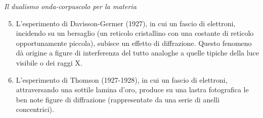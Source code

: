 \noindent \emph{Il dualismo onda-corpuscolo per la materia}
\begin{enumerate}
    \setcounter{enumi}{4}
    \item L'esperimento di Davisson-Germer (1927), in cui un fascio di elettroni, incidendo su un bersaglio (un reticolo cristallino con una costante di reticolo opportunamente piccola), subisce un effetto di diffrazione. Questo fenomeno dà origine a figure di interferenza del tutto analoghe a quelle tipiche della luce visibile o dei raggi X.
    \item L'esperimento di Thomson (1927-1928), in cui un fascio di elettroni, attraversando una sottile lamina d'oro, produce su una lastra fotografica le ben note figure di diffrazione (rappresentate da una serie di anelli concentrici).
\end{enumerate}

